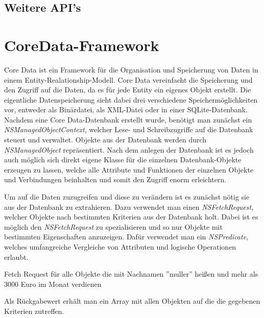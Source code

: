 \subsection{Weitere API's}
\label{sec:technologies:iosandxcode:otherapis}


\section{CoreData-Framework}
\label{sec:technologies:coredata}
Core Data ist ein Framework für die Organisation und Speicherung von Daten in einem Entity-Realationship-Modell.
Core Data vereinfacht die Speicherung und den Zugriff auf die Daten, da es für jede Entity ein eigenes Objekt erstellt.
Die eigentliche Datenspeicherung sieht dabei drei verschiedene Speichermöglichkeiten vor, entweder als Binärdatei, als XML-Datei oder in einer SQLite-Datenbank. 
Nachdem eine Core Data-Datenbank erstellt wurde, benötigt man zunächst ein \emph{NSManagedObjectContext}, welcher Lese- und Schreibzugriffe auf die Datenbank steuert und verwaltet.
Objekte aus der Datenbank werden durch \emph{NSManagedObject} repräsentiert. Nach dem anlegen der Datenbank ist es jedoch auch möglich sich direkt eigene Klasse für die einzelnen Datenbank-Objekte erzeugen zu lassen, welche alle Attribute und Funktionen der einzelnen Objekte und Verbindungen beinhalten und somit den Zugriff enorm erleichtern.

Um auf die Daten zuzugreifen und diese zu verändern ist es zunächst nötig sie aus der Datenbank zu extrahieren. Dazu verwendet man einen \emph{NSFetchRequest}, welcher Objekte nach bestimmten Kriterien aus der Datenbank holt.
Dabei ist es möglich den \emph{NSFetchRequest} zu spezialisieren und so nur Objekte mit bestimmten Eigenschaften anzuzeigen.
Dafür verwendet man ein \emph{NSPredicate}, welches umfangreiche Vergleiche von Attributen und logische Operationen erlaubt.

\begin{listing}[htb! breaklines=true]
    \caption{Fetch Request für alle Objekte die mit Nachnamen ''muller'' heißen und mehr als 3000 Euro im Monat verdienen}
	\label{lst:NSFetchRequest_objc}
\end{listing}

Als Rückgabewert erhält man ein Array mit allen Objekten auf die die gegebenen Kriterien zutreffen.
